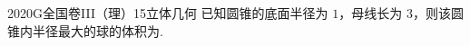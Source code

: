 
\begin{problem}{2020}{G}{全国卷III（理）}{15}{立体几何}
已知圆锥的底面半径为 $ 1 $，母线长为 $ 3 $，则该圆锥内半径最大的球的体积为\underline{\hspace{4em}}.
\end{problem}

\begin{answer}

\end{answer}

\begin{solutions}

\end{solutions}